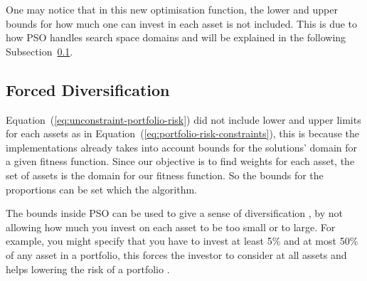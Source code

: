     One may notice that in this new optimisation function, the lower and upper bounds for how much one can invest in each asset is not included. This is due to how PSO handles search space domains and will be explained in the following Subsection~\ref{sub:forced_diversification}.
    \subsection{Forced Diversification} %
    \label{sub:forced_diversification}
    Equation~(\ref{eq:unconstraint-portfolio-risk}) did not include lower and upper limits for each assets as in Equation~(\ref{eq:portfolio-risk-constraints}), this is because the implementations \cite{haskellPSO} already takes into account bounds for the solutions' domain for a given fitness function. Since our objective is to find weights for each asset, the set of assets is the domain for our fitness function. So the bounds for the proportions can be set which the algorithm.

    The bounds inside PSO can be used to give a sense of diversification \cite{diversification}, by not allowing how much you invest on each asset to be too small or to large. For example, you might specify that you have to invest at least 5\% and at most 50\% of any asset in a portfolio, this forces the investor to consider at all assets and helps lowering the risk of a portfolio \cite{diversification}.
    
